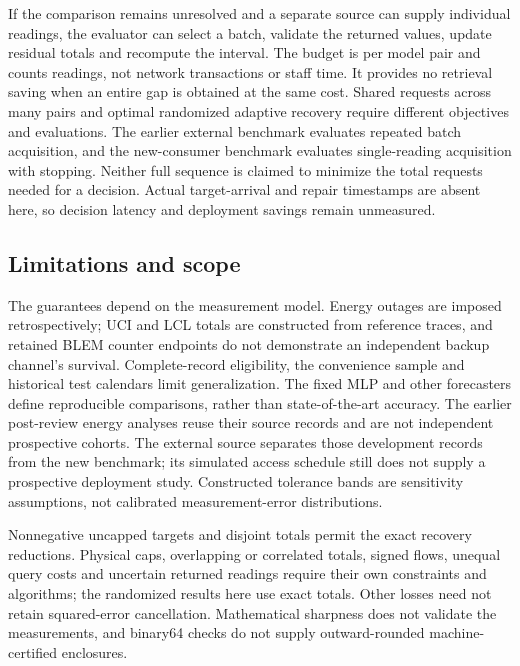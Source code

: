 \documentclass[12pt]{article}
\begin{document}
If the comparison remains unresolved and a separate source can supply
individual readings, the evaluator can select a batch, validate the returned
values, update residual totals and recompute the interval. The budget is
per model pair and counts readings, not network transactions or staff time.
It provides no retrieval saving when an entire gap is obtained at the same
cost. Shared requests across many pairs and optimal randomized adaptive recovery
require different objectives and evaluations. The earlier external benchmark evaluates repeated batch acquisition, and
the new-consumer benchmark evaluates single-reading acquisition with stopping. Neither full
sequence is claimed to minimize the total requests needed for a decision. Actual target-arrival and repair timestamps are absent here,
so decision latency and deployment savings remain unmeasured.

\subsection{Limitations and scope}
The guarantees depend on the measurement model. Energy outages are imposed
retrospectively; UCI and LCL totals are constructed from reference traces, and retained
BLEM counter endpoints do not demonstrate an independent backup channel's
survival. Complete-record eligibility, the convenience sample and historical
test calendars limit generalization. The fixed MLP and other forecasters
define reproducible comparisons, rather than state-of-the-art accuracy.
The earlier post-review energy analyses reuse their source records and are
not independent prospective cohorts. The external source separates those
development records from the new benchmark; its simulated access schedule
still does not supply a prospective deployment study. Constructed tolerance bands are sensitivity assumptions, not
calibrated measurement-error distributions.

Nonnegative uncapped targets and disjoint totals permit the exact recovery
reductions. Physical caps, overlapping or correlated totals, signed flows,
unequal query costs and uncertain returned readings require their own
constraints and algorithms; the randomized results here use exact totals.
Other losses need not retain squared-error cancellation. Mathematical
sharpness does not validate the measurements, and binary64 checks do not
supply outward-rounded machine-certified enclosures.

\FloatBarrier

\FloatBarrier
\end{document}

